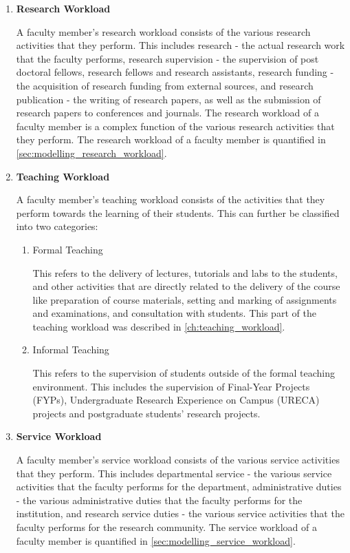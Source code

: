 \begin{enumerate}
  \item \textbf{Research Workload}

        A faculty member's research workload consists of the various research activities that they perform. This includes research - the actual research work that the faculty performs, research supervision - the supervision of post doctoral fellows, research fellows and research assistants, research funding - the acquisition of research funding from external sources, and research publication - the writing of research papers, as well as the submission of research papers to conferences and journals. The research workload of a faculty member is a complex function of the various research activities that they perform. The research workload of a faculty member is quantified in \autoref{sec:modelling_research_workload}.

  \item \textbf{Teaching Workload}

        A faculty member's teaching workload consists of the activities that they perform towards the learning of their students. This can further be classified into two categories:

        \begin{enumerate}
          \item Formal Teaching

                This refers to the delivery of lectures, tutorials and labs to the students, and other activities that are directly related to the delivery of the course like preparation of course materials, setting and marking of assignments and examinations, and consultation with students. This part of the teaching workload was described in \autoref{ch:teaching_workload}.

          \item Informal Teaching

                This refers to the supervision of students outside of the formal teaching environment. This includes the supervision of Final-Year Projects (FYPs), Undergraduate Research Experience on Campus (URECA) projects and postgraduate students' research projects.

        \end{enumerate}

  \item \textbf{Service Workload}

        A faculty member's service workload consists of the various service activities that they perform. This includes departmental service - the various service activities that the faculty performs for the department, administrative duties - the various administrative duties that the faculty performs for the institution, and research service duties - the various service activities that the faculty performs for the research community. The service workload of a faculty member is quantified in \autoref{sec:modelling_service_workload}.

\end{enumerate}

